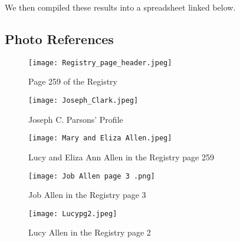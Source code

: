 \documentclass[
  letterpaper,
  DIV=11,
  numbers=noendperiod]{scrartcl}
\begin{document}
We then compiled these results into a spreadsheet linked below.

\hypertarget{photo-references}{%
\subsection{Photo References}\label{photo-references}}

\begin{figure}

{\centering \texttt{[image: Registry\_page\_header.jpeg]}

}

\caption{\label{fig-sample}Page 259 of the Registry}

\end{figure}

\begin{figure}

{\centering \texttt{[image: Joseph\_Clark.jpeg]}

}

\caption{\label{fig-sample8}Joseph C. Parsons' Profile}

\end{figure}

\begin{figure}

{\centering \texttt{[image: Mary and Eliza Allen.jpeg]}

}

\caption{\label{fig-sample4}Lucy and Eliza Ann Allen in the Registry
page 259}

\end{figure}

\begin{figure}

{\centering \texttt{[image: Job Allen page 3 .png]}

}

\caption{\label{fig-sample7}Job Allen in the Registry page 3}

\end{figure}

\begin{figure}

{\centering \texttt{[image: Lucypg2.jpeg]}

}

\caption{\label{fig-sample9}Lucy Allen in the Registry page 2}

\end{figure}
\end{document}
